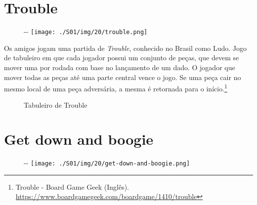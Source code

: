 \hypertarget{trouble}{%
\section{Trouble}\label{trouble}}

\begin{figure}[!ht]
  \begin{adjustwidth}{-\oddsidemargin-1in}{-\rightmargin}
    \centering
    \texttt{[image: ./S01/img/20/trouble.png]}
  \end{adjustwidth}
\end{figure}

Os amigos jogam uma partida de \emph{Trouble}, conhecido no Brasil como
Ludo. Jogo de tabuleiro em que cada jogador possui um conjunto de peças,
que devem se mover uma por rodada com base no lançamento de um dado. O
jogador que mover todas as peças até uma parte central vence o jogo. Se
uma peça cair no mesmo local de uma peça adversária, a mesma é retornada
para o início.\footnote{\sloppy Trouble - Board Game Geek (Inglês). \url{https://www.boardgamegeek.com/boardgame/1410/trouble}}

\begin{figure}
  \centering
    \caption{Tabuleiro de Trouble\label{fig:tabuleiro-de-trouble}}
\end{figure}

\hypertarget{get-down-and-boogie}{%
\section{Get down and boogie}\label{get-down-and-boogie}}

\begin{figure}[!ht]
  \begin{adjustwidth}{-\oddsidemargin-1in}{-\rightmargin}
    \centering
    \texttt{[image: ./S01/img/20/get-down-and-boogie.png]}
  \end{adjustwidth}
\end{figure}

